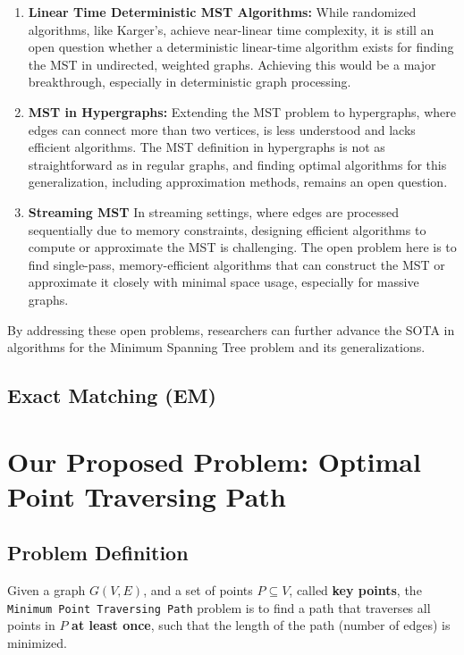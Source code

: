 \documentclass[11pt]{article}
\theoremstyle{plain}
\begin{document}
\begin{enumerate}
    \item \textbf{Linear Time Deterministic MST Algorithms:} While randomized algorithms, like Karger's, achieve near-linear time complexity, it is still an open question whether a deterministic linear-time algorithm exists for finding the MST in undirected, weighted graphs. Achieving this would be a major breakthrough, especially in deterministic graph processing.
    \item \textbf{MST in Hypergraphs:} Extending the MST problem to hypergraphs, where edges can connect more than two vertices, is less understood and lacks efficient algorithms. The MST definition in hypergraphs is not as straightforward as in regular graphs, and finding optimal algorithms for this generalization, including approximation methods, remains an open question.
    \item \textbf{Streaming MST} In streaming settings, where edges are processed sequentially due to memory constraints, designing efficient algorithms to compute or approximate the MST is challenging. The open problem here is to find single-pass, memory-efficient algorithms that can construct the MST or approximate it closely with minimal space usage, especially for massive graphs.
\end{enumerate}

By addressing these open problems, researchers can further advance the SOTA in algorithms for the Minimum Spanning Tree problem and its generalizations.

\subsection{Exact Matching (EM)}



\section{Our Proposed Problem: Optimal Point Traversing Path}

\subsection{Problem Definition}

Given a graph $G(V,E)$, and a set of points $P\subseteq V$, called \textbf{key points}, the \texttt{Minimum Point Traversing Path} problem is to find a path that traverses all points in $P$ \textbf{at least once}, such that the length of the path (number of edges) is minimized. 
\end{document}
